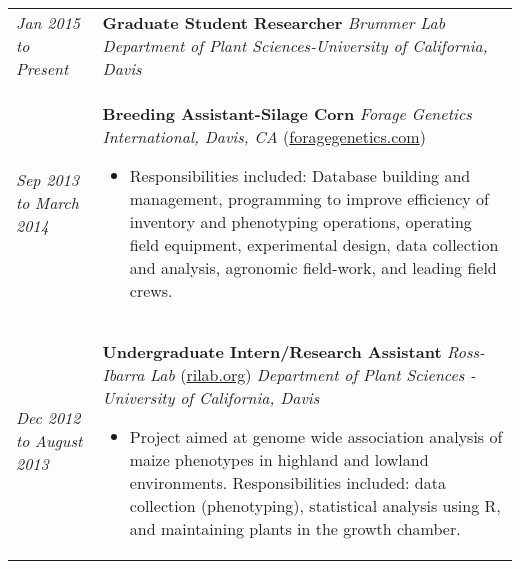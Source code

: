 ﻿\documentclass[a4paper]{article}
\begin{document}
\begin{tabular}{p{3cm} p{14cm}}

\vspace{0pt} 
\textit{Jan 2015}\newline
\textit{to}\newline
\textit{Present}\newline
& 
\vspace{0pt}
\textbf{Graduate Student Researcher}\newline
\textit{Brummer Lab}\newline
\textit{Department of Plant Sciences-University of California, Davis}
%
\\
%
\vspace{0pt} 
\textit{Sep 2013}\newline
\textit{to}\newline
\textit{March 2014}\newline
& 
\vspace{0pt}
\textbf{Breeding Assistant-Silage Corn}\newline
\textit{Forage Genetics International, Davis, CA} (\href{http://www.foragegenetics.com/}{foragegenetics.com})
\begin{itemize}[noitemsep,topsep=0pt]
  \item Responsibilities included: Database building and management, programming to improve efficiency of inventory and phenotyping operations, operating field equipment, experimental design, data collection and analysis, agronomic field-work, and leading field crews.
\end{itemize}
%
\\
%
\vspace{0pt} 
\textit{Dec 2012}\newline
\textit{to}\newline
\textit{August 2013}\newline
& 
\vspace{0pt}
\textbf{Undergraduate Intern/Research Assistant}\newline
\textit{Ross-Ibarra Lab} (\href{http://www.rilab.org/}{rilab.org})\newline
\textit{Department of Plant Sciences - University of California, Davis}
\begin{itemize}[noitemsep,topsep=0pt]
  \item Project aimed at genome wide association analysis of maize phenotypes in highland and lowland environments. Responsibilities included: data collection (phenotyping), statistical analysis using R, and maintaining plants in the growth chamber.

\end{itemize}
\end{tabular}
\end{document}
